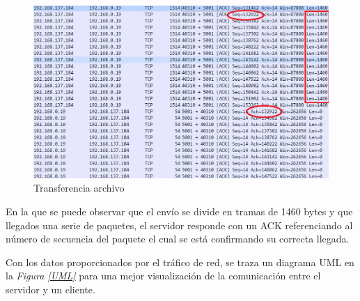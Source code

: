 \documentclass[a4paper,11pt]{book}
\begin{document}
\begin{figure}[hbtp]
\centering
\includegraphics[width = 16 cm]{FIGURAS/intercambio_grabacion.png}
\caption{Transferencia archivo}
\label{transf}
\end{figure}

En la que se puede observar que el envío se divide en tramas de 1460 bytes y que llegados una serie de paquetes, el servidor responde con un ACK referenciando al número de secuencia del paquete el cual se está confirmando su correcta llegada.	
				
			Con los datos proporcionados por el tráfico de red, se traza un diagrama UML en la \textit{Figura \ref{UML}} para una mejor visualización de la comunicación entre el servidor y un cliente.
			
\end{document}
